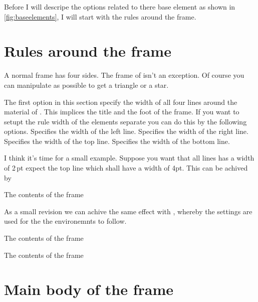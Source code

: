 \documentclass[openany,12pt,tocdepth=3,showframe]{ltx-md}
\begin{document}
\vspace*{\baselineskip}
Before I will descripe the options related to there base element as shown in \autoref{fig:baseelements}, 
I will start with the rules around the frame.

\section{Rules around the frame}\label{sec:lines}
A normal frame has four sides. The frame of  isn't an exception. Of course
you can manipulate as possible to get a triangle or a star.

The first option in this section specify the width of all four lines around the material of .
This implices the title and the foot of the frame. If you want to setupt the rule width of the elements
separate you can do this by the following options.
Specifies the width of the left line.
Specifies the width of the right line.
Specifies the width of the top line.
Specifies the width of the bottom line.

I think it's time for a small example. Suppose you want that all lines has a width of
2\,pt expect the top line which shall have a width of 4pt. This can be achived by
\begin{ltxexample}[caption=Loading the package,label=loading]
 \begin{xframed}[line-width=2pt,line-width-top=4pt]
   The contents of the frame
 \end{xframed}
\end{ltxexample}
As a small revision we can achive the same effect with , 
whereby the settings are used for the the environemnts  to follow.
\begin{ltxexample}[caption=Loading the package,label=loading]
 \xframedsetup[line-width=2pt,line-width-top=4pt]
 \begin{xframed}
   The contents of the frame
 \end{xframed}
\end{ltxexample}

\begin{xframed}[line-width=2pt,line-width-top=4pt,left-margin=0pt]
   The contents of the frame
\end{xframed}

\section{Main body of the frame}\label{sec:element-main}
\end{document}
